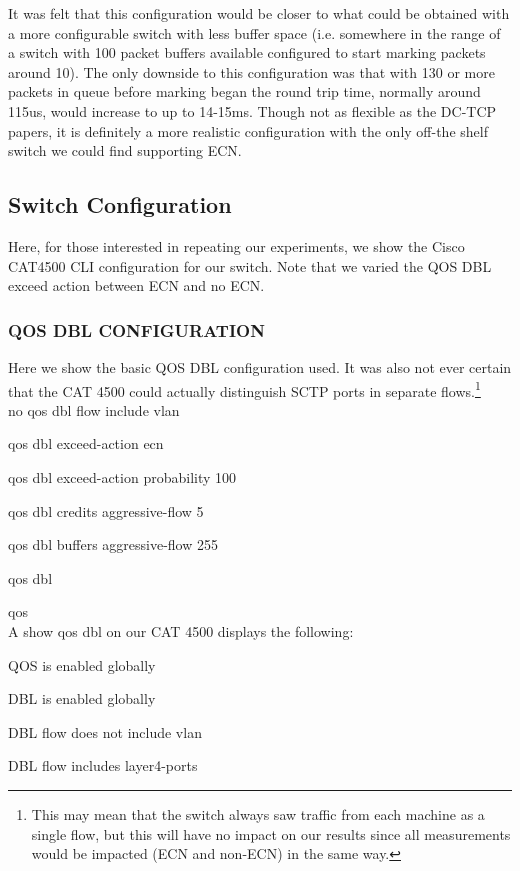\documentclass[12pt]{article}
\begin{document}
 It was felt that this configuration would be closer to what could be obtained with a more
 configurable switch with less buffer space (i.e. somewhere in the range of a switch with
 100 packet buffers available configured to start marking packets around 10).  The only downside
 to this configuration was that with 130 or more packets in queue before marking began the
 round trip time, normally around 115us, would increase to up to 14-15ms.
 Though not as flexible as the DC-TCP papers, it is definitely a more realistic configuration with the only
 off-the shelf  switch we could find supporting ECN.

\subsection{Switch Configuration}

Here, for those interested in repeating our experiments, we show the Cisco CAT4500 CLI
configuration for our switch.  Note that we varied the QOS DBL exceed action between
ECN and no ECN.

\subsubsection{QOS DBL CONFIGURATION}
 
Here we show the basic QOS DBL configuration used. It was
also not ever certain that the CAT 4500 could actually distinguish SCTP ports in separate flows.\footnote{This
may mean that the switch always saw traffic from each machine as a single flow, but this will have no impact on
our results since all measurements would be impacted (ECN and non-ECN) in the same way.}
 \\

no qos dbl flow include vlan

qos dbl exceed-action ecn

qos dbl exceed-action probability 100

qos dbl credits aggressive-flow 5

qos dbl buffers aggressive-flow 255

qos dbl   

qos
\\
A show qos dbl on our CAT 4500 displays the following:

QOS is enabled globally

DBL is enabled globally

DBL flow does not include vlan

DBL flow includes layer4-ports
\end{document}
